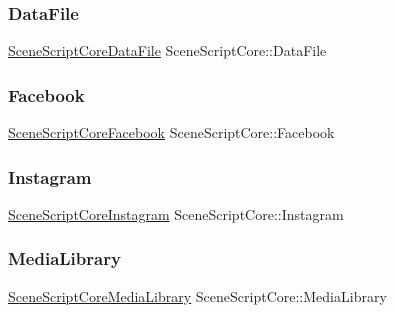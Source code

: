 \subsubsection{\texorpdfstring{Data\+File}{DataFile}}
{\footnotesize\ttfamily \hyperlink{class_scene_script_core_data_file}{Scene\+Script\+Core\+Data\+File} Scene\+Script\+Core\+::\+Data\+File}

\hypertarget{class_scene_script_core_a8fdeb99363c198dbc90aa126a39f9628}{}\label{class_scene_script_core_a8fdeb99363c198dbc90aa126a39f9628} 
\subsubsection{\texorpdfstring{Facebook}{Facebook}}
{\footnotesize\ttfamily \hyperlink{class_scene_script_core_facebook}{Scene\+Script\+Core\+Facebook} Scene\+Script\+Core\+::\+Facebook}

\hypertarget{class_scene_script_core_a095b0c30c2d27fe428e9af209ec8cb7f}{}\label{class_scene_script_core_a095b0c30c2d27fe428e9af209ec8cb7f} 
\subsubsection{\texorpdfstring{Instagram}{Instagram}}
{\footnotesize\ttfamily \hyperlink{class_scene_script_core_instagram}{Scene\+Script\+Core\+Instagram} Scene\+Script\+Core\+::\+Instagram}

\hypertarget{class_scene_script_core_af8c348869a46c159cee239ee138a2764}{}\label{class_scene_script_core_af8c348869a46c159cee239ee138a2764} 
\subsubsection{\texorpdfstring{Media\+Library}{MediaLibrary}}
{\footnotesize\ttfamily \hyperlink{class_scene_script_core_media_library}{Scene\+Script\+Core\+Media\+Library} Scene\+Script\+Core\+::\+Media\+Library}

\hypertarget{class_scene_script_core_abe267e6c8c7c36e20a605369885d8c4e}{}\label{class_scene_script_core_abe267e6c8c7c36e20a605369885d8c4e} 
